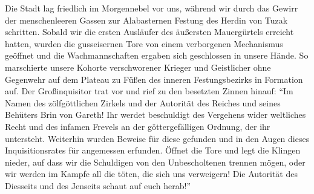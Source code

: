 Die Stadt lag friedlich im Morgennebel vor uns, während wir durch das Gewirr der menschenleeren Gassen zur Alabasternen Festung des Herdin von Tuzak schritten. Sobald wir die ersten Ausläufer des äußersten Mauergürtels erreicht hatten, wurden die gusseisernen Tore von einem verborgenen Mechanismus geöffnet und die Wachmannschaften ergaben sich geschlossen in unsere Hände. So marschierte unsere Kohorte verschworener Krieger und Geistlicher ohne Gegenwehr auf dem Plateau zu Füßen des inneren Festungsbezirks in Formation auf. Der Großinquisitor trat vor und rief zu den besetzten Zinnen hinauf: ``Im Namen des zölfgöttlichen Zirkels und der Autorität des Reiches und seines Behüters Brin von Gareth! Ihr werdet beschuldigt des Vergehens wider weltliches Recht und des infamen Frevels an der göttergefälligen Ordnung, der ihr untersteht. Weiterhin wurden Beweise für diese gefunden und in den Augen dieses Inquisitionsrates für angemessen erfunden. Öffnet die Tore und legt die Klingen nieder, auf dass wir die Schuldigen von den Unbescholtenen trennen mögen, oder wir werden im Kampfe all die töten, die sich uns verweigern! Die Autorität des Diesseits und des Jenseits schaut auf euch herab!''

